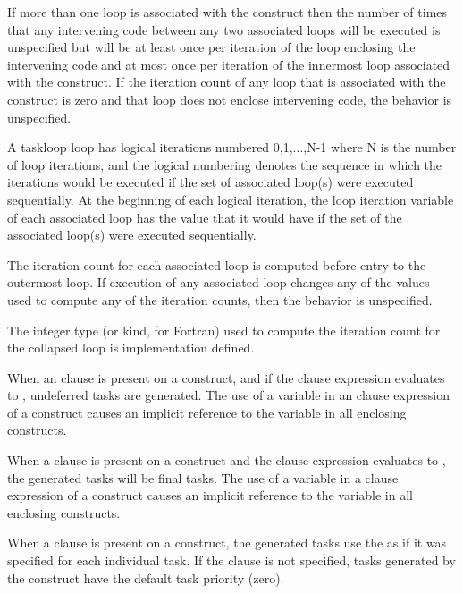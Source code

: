 If more than one loop is associated with the  construct
then the number of times that any intervening code between any two
associated loops will be executed is unspecified but will be at least
once per iteration of the loop enclosing the intervening code and at
most once per iteration of the innermost loop associated with the
construct.  If the iteration count of any loop that is associated with the
 construct is zero and that loop does not enclose intervening
code, the behavior is unspecified.


A taskloop loop has logical iterations numbered 0,1,...,N-1 where N is
the number of loop iterations, and the logical numbering denotes the
sequence in which the iterations would be executed if the set of
associated loop(s) were executed sequentially.  At the beginning of
each logical iteration, the loop iteration variable of each associated
loop has the value that it would have if the set of the associated
loop(s) were executed sequentially.

The iteration count for each associated loop is computed before entry 
to the outermost loop. If execution of any associated loop changes any 
of the values used to compute any of the iteration counts, then the 
behavior is unspecified.

The integer type (or kind, for Fortran) used to compute the iteration 
count for the collapsed loop is implementation defined.

When an  clause is present on a  construct, and 
if the  clause expression evaluates to , undeferred 
tasks are generated. The use of a variable in an  clause expression 
of a  construct causes an implicit reference to the variable 
in all enclosing constructs.

When a  clause is present on a  construct and 
the  clause expression evaluates to , the generated 
tasks will be final tasks. The use of a variable in a  clause 
expression of a  construct causes an implicit reference to 
the variable in all enclosing constructs.

When a  clause is present on a  construct,
the generated tasks use the  as if it was specified 
for each individual task. If the  clause is not specified, 
tasks generated by the  construct have the default task 
priority (zero).

